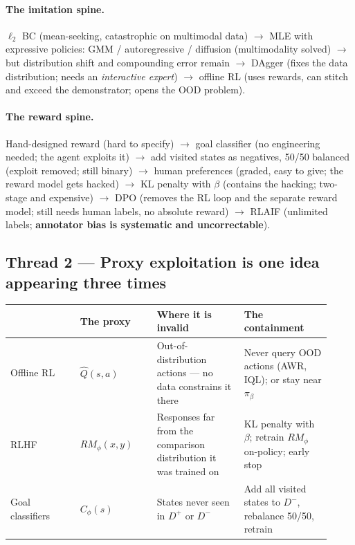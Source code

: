 \documentclass[11pt,a4paper]{article}
\begin{document}
\paragraph{The imitation spine.}
$\ell_2$ BC (mean-seeking, catastrophic on multimodal data)
$\rightarrow$ MLE with expressive policies: GMM / autoregressive / diffusion (multimodality solved)
$\rightarrow$ but distribution shift and compounding error remain
$\rightarrow$ DAgger (fixes the data distribution; needs an \emph{interactive expert})
$\rightarrow$ offline RL (uses rewards, can stitch and exceed the demonstrator; opens the OOD problem).

\paragraph{The reward spine.}
Hand-designed reward (hard to specify)
$\rightarrow$ goal classifier (no engineering needed; the agent exploits it)
$\rightarrow$ add visited states as negatives, 50/50 balanced (exploit removed; still binary)
$\rightarrow$ human preferences (graded, easy to give; the reward model gets hacked)
$\rightarrow$ KL penalty with $\beta$ (contains the hacking; two-stage and expensive)
$\rightarrow$ DPO (removes the RL loop and the separate reward model; still needs human labels, no absolute reward)
$\rightarrow$ RLAIF (unlimited labels; \textbf{annotator bias is systematic and uncorrectable}).

\subsection{Thread 2 --- Proxy exploitation is one idea appearing three times}

\begin{center}
\begin{tabular}{@{}p{0.20\linewidth}p{0.22\linewidth}p{0.25\linewidth}p{0.25\linewidth}@{}}
\toprule
& \textbf{The proxy} & \textbf{Where it is invalid} & \textbf{The containment} \\
\midrule
Offline RL & $\hat Q(s,a)$ & Out-of-distribution actions --- no data constrains it there & Never query OOD actions (AWR, IQL); or stay near $\pi_\beta$ \\
\addlinespace
RLHF & $RM_\phi(x,y)$ & Responses far from the comparison distribution it was trained on & KL penalty with $\beta$; retrain $RM_\phi$ on-policy; early stop \\
\addlinespace
Goal classifiers & $C_\phi(s)$ & States never seen in $D^+$ or $D^-$ & Add all visited states to $D^-$, rebalance 50/50, retrain \\
\bottomrule
\end{tabular}
\end{center}
\end{document}
